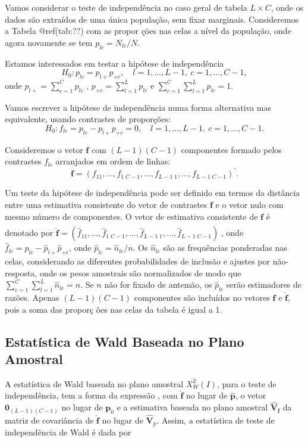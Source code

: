 \documentclass[]{book}
\numberwithin{example}{chapter}
\numberwithin{remark}{chapter}
\numberwithin{definition}{chapter}
\begin{document}
Vamos considerar o teste de independência no caso geral de tabela
\(L\times C\), onde os dados são extraídos de uma única população, sem
fixar marginais. Consideremos a Tabela @ref(tab:??) com as propor ções
nas celas a nível da população, onde agora novamente se tem
\(p_{lc}=N_{lc}/N\).

Estamos interessados em testar a hipótese de independência \[
H_{0}:p_{lc}=p_{l+}p_{+c},\quad l=1,\ldots ,L-1,\ c=1,\ldots,C-1, 
\] onde \(p_{l+}=\sum_{c=1}^{C}p_{lc}\) ,
\(p_{+c}=\sum_{l=1}^{L}p_{lc}\) e
\(\sum_{c=1}^{C}\sum_{l=1}^{L}p_{lc}=1\).

Vamos escrever a hipótese de independência numa forma alternativa mas
equivalente, usando contrastes de proporções: \[
H_{0}:f_{lc}=p_{lc}-p_{l+}p_{+c}=0,\quad l=1,\ldots ,L-1,\ c=1,\ldots
,C-1.
\]

Consideremos o vetor \(\mathbf{f}\) com
\(\left( L-1\right) \left( C-1\right)\) componentes formado pelos
contrastes \(f_{lc}\) arranjados em ordem de linhas: \[
\mathbf{f}=\left( f_{11},\ldots ,f_{1\;C-1},\ldots ,f_{L-1\;1},\ldots
,f_{L-1\;C-1}\right) ^{\prime }. 
\]

Um teste da hipótese de independência pode ser definido em termos da
distância entre uma estimativa consistente do vetor de contrastes
\(\mathbf{f}\) e o vetor nulo com mesmo número de componentes. O vetor
de estimativa consistente de \(\mathbf{f}\) é denotado por
\(\mathbf{\hat{f}}=\left( \hat{f}_{11},\ldots ,\hat{f}_{1\;C-1},\ldots ,\hat{f} _{L-1\;1},\ldots ,\hat{f}_{L-1\;C-1}\right) ^{^{\prime }}\),
onde \(\hat{f} _{lc}=\hat{p}_{lc}-\hat{p}_{l+}\hat{p}_{+c}\), onde
\(\hat{p}_{lc}=\hat{n} _{lc}/n\). Os \(\hat{n}_{lc}\) são as frequências
ponderadas nas celas, considerando as diferentes probabilidades de
inclusão e ajustes por não-resposta, onde os pesos amostrais são
normalizados de modo que \(\sum_{c=1}^{C}\sum_{l=1}^{L}\hat{n}_{lc}=n\).
Se \(n\) não for fixado de antemão, os \(\hat{p}_{lc}\) serão
estimadores de razões. Apenas \(\left( L-1\right) \left( C-1\right)\)
componentes são incluídos no vetores \(\mathbf{f}\) e
\(\mathbf{\hat{f}}\), pois a soma das proporç ões nas celas da tabela é
igual a 1.

\subsection{Estatística de Wald Baseada no Plano
Amostral}\label{estatistica-de-wald-baseada-no-plano-amostral-1}

A estatística de Wald baseada no plano amostral
\(X_{W}^{2}\left(I\right)\), para o teste de independência, tem a forma
da expressão \label{eq:Tab8}, com \(\mathbf{\hat{f}}\) no lugar de
\(\mathbf{\hat{p}}\), o vetor
\(\mathbf{0}_{\left( L-1\right)\left( C-1\right)}\) no lugar de
\(\mathbf{p}_{0}\) e a estimativa baseada no plano amostral
\(\mathbf{\hat{V}}_{\mathbf{f}}\) da matriz de covariância de
\(\mathbf{\hat{f}}\) no lugar de \(\mathbf{ \hat{V}}_{p}\). Assim, a
estatística de teste de independência de Wald é dada por
\end{document}

